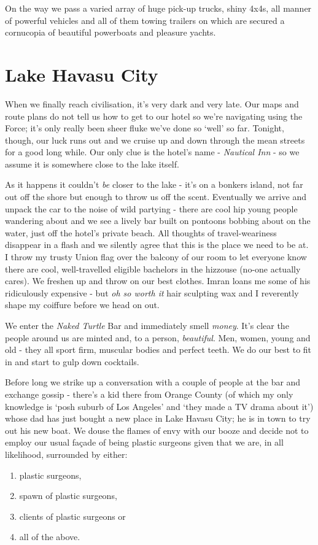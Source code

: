 \documentclass[a5paper,titlepage,11pt]{book}
\begin{document}
On the way we pass a varied array of huge pick-up trucks, shiny 4x4s, all manner of powerful vehicles and all of them towing trailers on which are secured a cornucopia of beautiful powerboats and pleasure yachts.


\section*{Lake Havasu City}
When we finally reach civilisation, it's very dark and very late.  Our maps and route plans do not tell us how to get to our hotel so we're navigating using the Force; it's only really been sheer fluke we've done so `well' so far.  Tonight, though, our luck runs out and we cruise up and down through the mean streets for a good long while.  Our only clue is the hotel's name - \emph{Nautical Inn} - so we assume it is somewhere close to the lake itself.

As it happens it couldn't \emph{be} closer to the lake - it's on a bonkers island, not far out off the shore but enough to throw us off the scent.  Eventually we arrive and unpack the car to the noise of wild partying - there are cool hip young people wandering about and we see a lively bar built on pontoons bobbing about on the water, just off the hotel's private beach.  All thoughts of travel-weariness disappear in a flash and we silently agree that this is the place we need to be at.  I throw my trusty Union flag over the balcony of our room to let everyone know there are cool, well-travelled eligible bachelors in the hizzouse (no-one actually cares).  We freshen up and throw on our best clothes.  Imran loans me some of his ridiculously expensive - but \emph{oh so worth it} hair sculpting wax and I reverently shape my coiffure before we head on out.

We enter the \emph{Naked Turtle} Bar and immediately smell \emph{money}.  It's clear the people around us are minted and, to a person, \emph{beautiful}.  Men, women, young and old - they all sport firm, muscular bodies and perfect teeth.  We do our best to fit in and start to gulp down cocktails.

Before long we strike up a conversation with a couple of people at the bar and exchange gossip - there's a kid there from Orange County (of which my only knowledge is `posh suburb of Los Angeles' and `they made a TV drama about it') whose dad has just bought a new place in Lake Havasu City; he is in town to try out his new boat.  We douse the flames of envy with our booze and decide not to employ our usual fa\c{c}ade of being plastic surgeons given that we are, in all likelihood, surrounded by either:
\begin{enumerate}
\item plastic surgeons,
\item spawn of plastic surgeons,
\item clients of plastic surgeons or
\item all of the above.
\end{enumerate}
\end{document}
